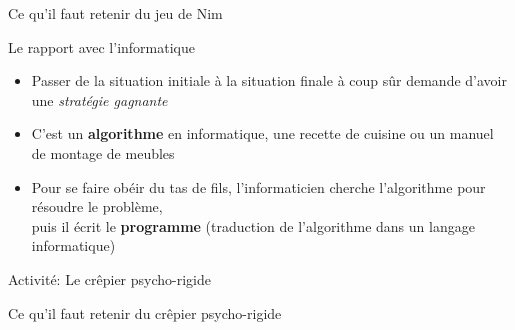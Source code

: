 \documentclass[final,hyperref={pdfpagelabels=false}]{beamer}
\begin{document}
\begin{frame}{Ce qu'il faut retenir du jeu de Nim}
  \begin{block}{Le rapport avec l'informatique}
    \begin{itemize}
    \item Passer de la situation initiale à la situation finale à coup sûr demande d'avoir
      une \textit{stratégie gagnante}
    \item C'est un \alert{\textbf{algorithme}} en informatique, une recette de
      cuisine ou un manuel de montage de meubles
    \item Pour se faire obéir du tas de fils, l'informaticien cherche
      l'algorithme pour résoudre le problème,\\
      puis il écrit le \alert{\textbf{programme}} (traduction de l'algorithme
      dans un langage informatique)
    \end{itemize}
  \end{block}
\end{frame}
\begin{frame}{Activité: Le crêpier psycho-rigide}
  
\end{frame}
\begin{frame}{Ce qu'il faut retenir du  crêpier psycho-rigide}
  
\end{frame}
\end{document}
